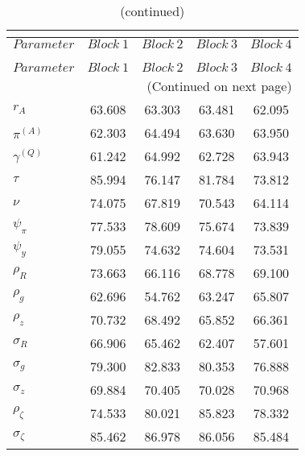  
\begin{center}
\begin{longtable}{lcccc} 
\caption{MCMC Inefficiency factors per block}\\
 \label{Table:MCMC_inefficiency_factors}\\
\toprule 
$Parameter         $	 & 	 $     Block~1$	 & 	 $     Block~2$	 & 	 $     Block~3$	 & 	 $     Block~4$\\
\midrule \endfirsthead 
\caption{(continued)}\\
 \toprule \\ 
$Parameter         $	 & 	 $     Block~1$	 & 	 $     Block~2$	 & 	 $     Block~3$	 & 	 $     Block~4$\\
\midrule \endhead 
\midrule \multicolumn{5}{r}{(Continued on next page)} \\ \bottomrule \endfoot 
\bottomrule \endlastfoot 
$ {r_{A}}          $	 & 	      63.608	 & 	      63.303	 & 	      63.481	 & 	      62.095 \\ 
$ {\pi^{(A)}}      $	 & 	      62.303	 & 	      64.494	 & 	      63.630	 & 	      63.950 \\ 
$ {\gamma^{(Q)}}   $	 & 	      61.242	 & 	      64.992	 & 	      62.728	 & 	      63.943 \\ 
$ {\tau}           $	 & 	      85.994	 & 	      76.147	 & 	      81.784	 & 	      73.812 \\ 
$ {\nu}            $	 & 	      74.075	 & 	      67.819	 & 	      70.543	 & 	      64.114 \\ 
$ {\psi_\pi}       $	 & 	      77.533	 & 	      78.609	 & 	      75.674	 & 	      73.839 \\ 
$ {\psi_y}         $	 & 	      79.055	 & 	      74.632	 & 	      74.604	 & 	      73.531 \\ 
$ {\rho_R}         $	 & 	      73.663	 & 	      66.116	 & 	      68.778	 & 	      69.100 \\ 
$ {\rho_{g}}       $	 & 	      62.696	 & 	      54.762	 & 	      63.247	 & 	      65.807 \\ 
$ {\rho_z}         $	 & 	      70.732	 & 	      68.492	 & 	      65.852	 & 	      66.361 \\ 
$ {\sigma_R}       $	 & 	      66.906	 & 	      65.462	 & 	      62.407	 & 	      57.601 \\ 
$ {\sigma_{g}}     $	 & 	      79.300	 & 	      82.833	 & 	      80.353	 & 	      76.888 \\ 
$ {\sigma_z}       $	 & 	      69.884	 & 	      70.405	 & 	      70.028	 & 	      70.968 \\ 
$ {\rho_\zeta}     $	 & 	      74.533	 & 	      80.021	 & 	      85.823	 & 	      78.332 \\ 
$ {\sigma_\zeta}   $	 & 	      85.462	 & 	      86.978	 & 	      86.056	 & 	      85.484 \\ 
\end{longtable}
 \end{center}
